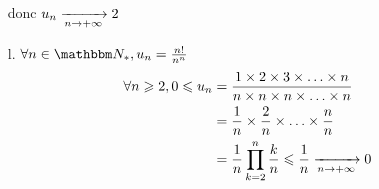 \begin{enumerate}
\[		\] donc $u_n \xrightarrow[n \to +\infty]{} 2$
	\item[l.] $\forall n \in \N_*, u_n = \frac{n!}{n^n}$\\
		\begin{align*}
			\forall n \geqslant 2, 0 \leqslant u_n &= \frac{1 \times 2 \times  3 \times \ldots \times n}{n \times n \times n \times \ldots \times n}\\
			&= \frac{1}{n} \times \frac{2}{n} \times \ldots \times \frac{n}{n} \\
			&= \frac{1}{n}\prod_{k=2}^n \frac{k}{n} \leqslant \frac{1}{n} \xrightarrow[n \to +\infty]{} 0 \\
		\end{align*}
\end{enumerate}









